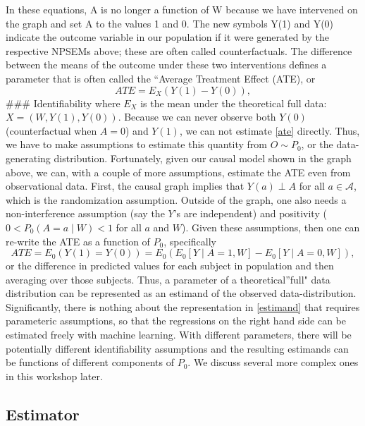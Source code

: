 \documentclass[]{article}
\begin{document}
In these equations, A is no longer a function of W because we have
intervened on the graph and set A to the values 1 and 0. The new symbols
Y(1) and Y(0) indicate the outcome variable in our population if it were
generated by the respective NPSEMs above; these are often called
counterfactuals. The difference between the means of the outcome under
these two interventions defines a parameter that is often called the
``Average Treatment Effect (ATE), or \begin{equation}
\label{ate}
ATE = E_X(Y(1)-Y(0)),
\end{equation} \#\#\# Identifiability where \(E_X\) is the mean under
the theoretical full data: \(X=(W,Y(1),Y(0))\). Because we can never
observe both \(Y(0)\) (counterfactual when \(A=0\)) and \(Y(1)\), we can
not estimate \ref{ate} directly. Thus, we have to make assumptions to
estimate this quantity from \(O \sim P_0\), or the data-generating
distribution. Fortunately, given our causal model shown in the graph
above, we can, with a couple of more assumptions, estimate the ATE even
from observational data. First, the causal graph implies that
\(Y(a) \perp A\) for all \(a \in \mathcal{A}\), which is the
randomization assumption. Outside of the graph, one also needs a
non-interference assumption (say the \(Y\)'s are independent) and
positivity (\(0<P_0(A=a\mid W)< 1\) for all \(a\) and \(W\)). Given
these assumptions, then one can re-write the ATE as a function of
\(P_0\), specifically \begin{equation}
\label{estimand}
ATE = E_0(Y(1)=Y(0)) = E_0\left( E_0[Y \mid A=1,W]-E_0[Y \mid A=0,W] \right),
\end{equation} or the difference in predicted values for each subject in
population and then averaging over those subjects. Thus, a parameter of
a theoretical''full" data distribution can be represented as an estimand
of the observed data-distribution. Significantly, there is nothing about
the representation in \ref{estimand} that requires parameteric
assumptions, so that the regressions on the right hand side can be
estimated freely with machine learning. With different parameters, there
will be potentially different identifiability assumptions and the
resulting estimands can be functions of different components of \(P_0\).
We discuss several more complex ones in this workshop later.

\hypertarget{estimator}{%
\subsection{Estimator}\label{estimator}}
\end{document}
